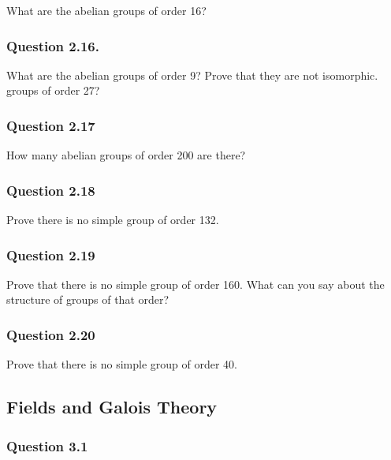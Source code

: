 What are the abelian groups of order 16?

\hypertarget{question-2.16.}{%
\subsubsection{Question 2.16.}\label{question-2.16.}}

What are the abelian groups of order 9? Prove that they are not
isomorphic. groups of order 27?

\hypertarget{question-2.17}{%
\subsubsection{Question 2.17}\label{question-2.17}}

How many abelian groups of order 200 are there?

\hypertarget{question-2.18}{%
\subsubsection{Question 2.18}\label{question-2.18}}

Prove there is no simple group of order 132.

\hypertarget{question-2.19}{%
\subsubsection{Question 2.19}\label{question-2.19}}

Prove that there is no simple group of order 160. What can you say about
the structure of groups of that order?

\hypertarget{question-2.20}{%
\subsubsection{Question 2.20}\label{question-2.20}}

Prove that there is no simple group of order 40.

\hypertarget{fields-and-galois-theory}{%
\subsection{Fields and Galois Theory}\label{fields-and-galois-theory}}

\hypertarget{question-3.1}{%
\subsubsection{Question 3.1}\label{question-3.1}}

